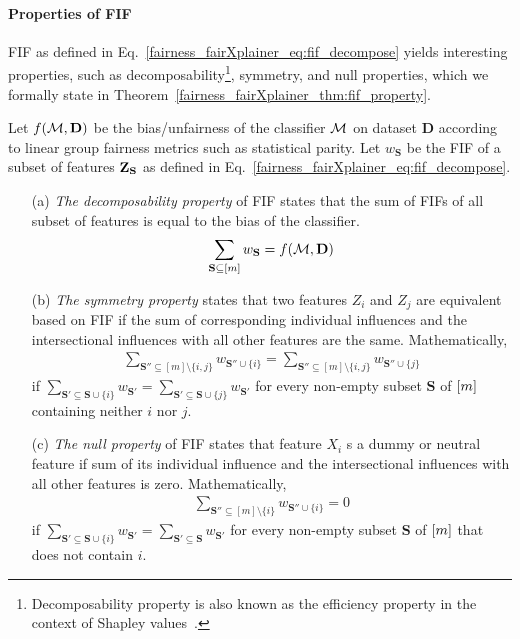 \paragraph{Properties of FIF} FIF as defined in Eq.~\eqref{fairness_fairXplainer_eq:fif_decompose} yields interesting properties, such as decomposability\footnote{Decomposability property is also known as the efficiency property in the context of Shapley values~\cite{roth1988shapley}.}, symmetry, and null properties, which we formally state in Theorem~\ref{fairness_fairXplainer_thm:fif_property}.

\begin{theorem}
	\label{fairness_fairXplainer_thm:fif_property}
	Let $ f(\mathcal{M}, \mathbf{D}) $ be the bias/unfairness of the classifier $ \mathcal{M} $ on dataset $ \mathbf{D} $ according to linear group fairness metrics such as statistical parity. Let $ w_{\mathbf{S}}  $ be the FIF of a subset of  features $ \mathbf{Z}_{\mathbf{S}} $ as defined in Eq.~\eqref{fairness_fairXplainer_eq:fif_decompose}. 
	\begin{enumerate}
		\item[(a)] \textit{The decomposability property} of FIF states that the sum of FIFs of all subset of  features is equal to the bias of the classifier. 
		\begin{align}\label{fairness_fairXplainer_eq:constraint_framework}
		\sum_{\mathbf{S} \subseteq [m] } w_{\mathbf{S}} = f(\mathcal{M}, \mathbf{D})
		\end{align}
		\item[(b)] \textit{The symmetry property} states that  two features $ Z_i $ and $ Z_j $ are equivalent based on FIF if the sum of corresponding individual influences and the intersectional influences with all other features are the same. Mathematically,
		\begin{align}
		\sum_{\mathbf{S}'' \subseteq [m]\setminus\{i,j\}}w_{\mathbf{S}''\cup \{i\}} = \sum_{\mathbf{S}'' \subseteq [m]\setminus\{i,j\}}w_{\mathbf{S}''\cup \{j\}}  
		\end{align}
		if $\sum_{\mathbf{S}' \subseteq \mathbf{S}\cup \{i\}} w_{\mathbf{S}'} = 		\sum_{\mathbf{S}' \subseteq \mathbf{S} \cup \{j\}} w_{\mathbf{S}'}$ for every non-empty subset $ \mathbf{S} $ of $ [m] $ containing neither $ i $ nor $ j $. 
 		\item[(c)] \textit{The null property} of FIF states that feature $ X_i $ s a dummy or neutral feature if sum of its individual influence and the intersectional influences with all other features is zero. Mathematically,
	\begin{align}
	 \sum_{\mathbf{S}'' \subseteq [m]\setminus \{i\}}w_{\mathbf{S}''\cup \{i\}} = 0 	 
	\end{align}
	if	$\sum_{\mathbf{S}' \subseteq \mathbf{S} \cup \{i\}} w_{\mathbf{S}'} = 		\sum_{\mathbf{S}' \subseteq \mathbf{S}} w_{\mathbf{S}'}$ for every non-empty subset $ \mathbf{S} $ of $ [m] $ that does not contain $ i $.
\end{enumerate}
\end{theorem}
